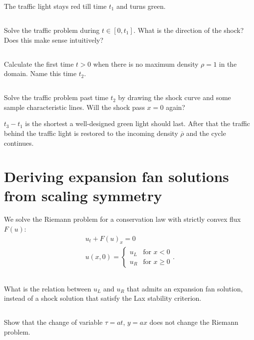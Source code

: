 \documentclass[11pt,letterpaper]{article}
\begin{document}
The traffic light stays red till time $t_1$ and turns green. 

\subsection{}
Solve the traffic problem during $t\in[0,t_1]$. What is the direction of the shock? Does this make sense intuitively?

\subsection{}
Calculate the first time $t>0$ when there is no maximum density $\rho=1$ in the domain. Name this time $t_2$.

\subsection{}
Solve the traffic problem past time $t_2$ by drawing the shock curve and some sample characteristic lines. Will the shock pass $x=0$ again? 

$t_3-t_1$ is the shortest a well-designed green light should last. After that the traffic behind the traffic light is restored to the incoming density $\overline{\rho}$ and the cycle continues.

\section{Deriving expansion fan solutions from scaling symmetry}
We solve the Riemann problem for a conservation law with strictly convex flux $F(u)$:
\begin{align}
    & u_t+F(u)_x = 0\\
    & u(x,0) = \begin{cases}
        u_L &\text{for }x<0\\
        u_R &\text{for }x\geq 0
    \end{cases}.
\end{align}

\subsection{}
What is the relation between $u_L$ and $u_R$ that admits an expansion fan solution, instead of a shock solution that satisfy the Lax stability criterion. 

\subsection{}
Show that the change of variable $\tau=at$, $y=ax$ does not change the Riemann problem. 
\end{document}
